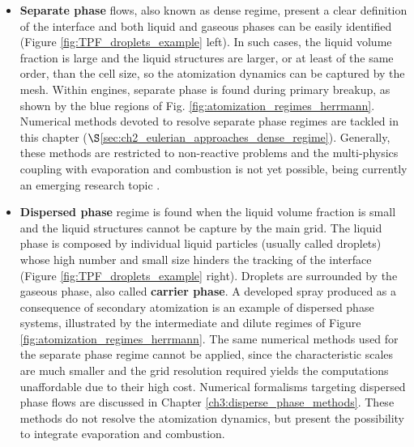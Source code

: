 

\begin{itemize}

\item \textbf{Separate phase} flows, also known as dense regime, present a clear definition of the interface and both liquid and gaseous phases can be easily identified (Figure \ref{fig:TPF_droplets_example} left). In such cases, the liquid volume fraction is large and the liquid structures are larger, or at least of the same order, than the cell size, so the atomization dynamics can be captured by the mesh. Within engines, separate phase is found during primary breakup, as shown by the blue regions of Fig. \ref{fig:atomization_regimes_herrmann}. Numerical methods devoted to resolve separate phase regimes are tackled in this chapter ($\S$\ref{sec:ch2_eulerian_approaches_dense_regime}). Generally, these methods are restricted to non-reactive problems and the multi-physics coupling with evaporation and combustion is not yet possible, being currently an emerging research topic .

\item \textbf{Dispersed phase} regime is found when the liquid volume fraction is small and the liquid structures cannot be capture by the main grid. The liquid phase is composed by individual liquid particles (usually called droplets) whose high number and small size hinders the tracking of the interface (Figure \ref{fig:TPF_droplets_example} right). Droplets are surrounded by the gaseous phase, also called \textbf{carrier phase}. A developed spray produced as a consequence of secondary atomization is an example of dispersed phase systems, illustrated by the intermediate and dilute regimes of Figure \ref{fig:atomization_regimes_herrmann}. The same numerical methods used for the separate phase regime cannot be applied, since the characteristic scales are much smaller and the grid resolution required yields the computations unaffordable due to their high cost. Numerical formalisms targeting dispersed phase flows are discussed in Chapter \ref{ch3:disperse_phase_methods}. These methods do not resolve the atomization dynamics, but present the possibility to integrate evaporation and combustion.

\end{itemize}

